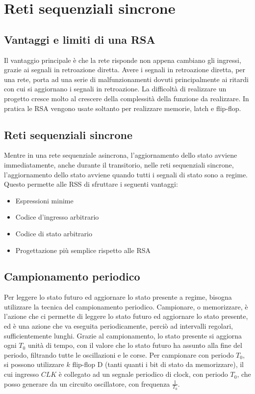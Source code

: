 \documentclass{article}
\begin{document}
\section{Reti sequenziali sincrone}

\subsection{Vantaggi e limiti di una RSA}

Il vantaggio principale è che la rete risponde non appena cambiano gli ingressi, grazie ai segnali in retroazione diretta.
Avere i segnali in retroazione diretta, per una rete, porta ad una serie di malfunzionamenti dovuti principalmente ai ritardi con cui si aggiornano i segnali in retroazione.
La difficoltà di realizzare un progetto cresce molto al crescere della complessità della funzione da realizzare.
In pratica le RSA vengono usate soltanto per realizzare memorie, latch e flip-flop.

\subsection{Reti sequenziali sincrone}

Mentre in una rete sequenziale asincrona, l'aggiornamento dello stato avviene immediatamente, anche durante il transitorio, nelle reti sequenziali sincrone, l'aggiornamento dello stato avviene quando tutti i segnali di stato sono a regime.
Questo permette alle RSS di sfruttare i seguenti vantaggi:

\begin{itemize}
    \item Espressioni minime
    \item Codice d'ingresso arbitrario
    \item Codice di stato arbitrario
    \item Progettazione più semplice rispetto alle RSA
\end{itemize}

\subsection{Campionamento periodico}

Per leggere lo stato futuro ed aggiornare lo stato presente a regime, bisogna utilizzare la tecnica del campionamento periodico.
Campionare, o memorizzare, è l'azione che ci permette di leggere lo stato futuro ed aggiornare lo stato presente, ed è una azione che va eseguita periodicamente, perciò ad intervalli regolari, sufficientemente lunghi.
Grazie al campionamento, lo stato presente si aggiorna ogni $T_0$ unità di tempo, con il valore che lo stato futuro ha assunto alla fine del periodo, filtrando tutte le oscillazioni e le corse.
Per campionare con periodo $T_0$, si possono utilizzare $k$ flip-flop D (tanti quanti i bit di stato da memorizzare), il cui ingresso $CLK$ è collegato ad un segnale periodico di clock, con periodo $T_0$, che posso generare da un circuito oscillatore, con frequenza $\frac{1}{T_0}$.
\end{document}
